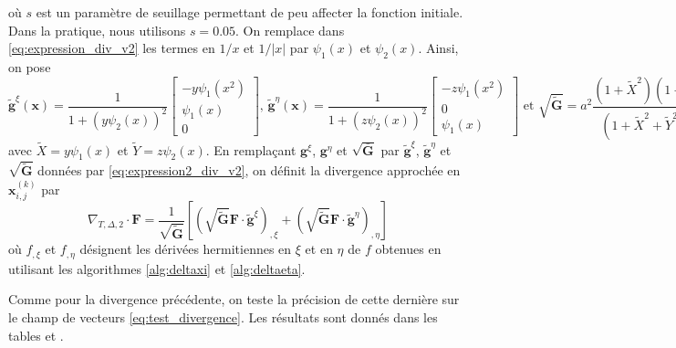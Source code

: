 où $s$ est un paramètre de seuillage permettant de peu affecter la fonction initiale. Dans la pratique, nous utilisons $s=0.05$. On remplace dans \eqref{eq:expression_div_v2} les termes en $1/x$ et $1/|x|$ par $\psi_1(x)$ et $\psi_2(x)$. Ainsi, on pose
\begin{equation}
\tilde{\mathbf{g}}^{\xi} (\mathbf{x} ) = \dfrac{1}{1 + (y\psi_2(x))^2} \begin{bmatrix}
- y\psi_1(x^2) \\
\psi_1(x) \\
0
\end{bmatrix} \text{, }
\tilde{\mathbf{g}}^{\eta} (\mathbf{x} ) = \dfrac{1}{1 + (z\psi_2(x))^2} \begin{bmatrix}
- z\psi_1(x^2) \\
0 \\
\psi_1(x)
\end{bmatrix}
 \text{ et } \sqrt{\tilde{\mathbf{G}}} = a^2 \dfrac{(1+\tilde{X}^2)(1+ \tilde{Y}^2)}{(1+\tilde{X}^2+\tilde{Y}^2)^{3/2}}
\label{eq:expression2_div_v2}
\end{equation}
avec $\tilde{X}=y \psi_1(x)$ et $\tilde{Y} = z \psi_2(x)$.
En remplaçant $\mathbf{g}^{\xi}$, $\mathbf{g}^{\eta}$ et $\sqrt{\bar{\mathbf{G}}}$ par $\tilde{\mathbf{g}}^{\xi}$, $\tilde{\mathbf{g}}^{\eta}$ et $\sqrt{\tilde{\mathbf{G}}}$ données par \eqref{eq:expression2_div_v2}, on définit la divergence approchée en $\mathbf{x}_{i,j}^{(k)}$ par
\begin{equation}
\nabla_{T,\Delta,2} \cdot \mathbf{F} = \dfrac{1}{\sqrt{\tilde{\mathbf{G}}}} \left[ \left( \sqrt{\tilde{\mathbf{G}}} \mathbf{F} \cdot \tilde{\mathbf{g}}^{\xi} \right)_{,\xi} + 
\left( \sqrt{\tilde{\mathbf{G}}} \mathbf{F} \cdot \tilde{\mathbf{g}}^{\eta} \right)_{,\eta}
\right]
\end{equation}
où $f_{,\xi}$ et $f_{,\eta}$ désignent les dérivées hermitiennes en $\xi$ et en $\eta$ de $f$ obtenues en utilisant les algorithmes \ref{alg:deltaxi} et \ref{alg:deltaeta}. 

Comme pour la divergence précédente, on teste la précision de cette dernière sur le champ de vecteurs \eqref{eq:test_divergence}. Les résultats sont donnés dans les tables \REF et \REF.

